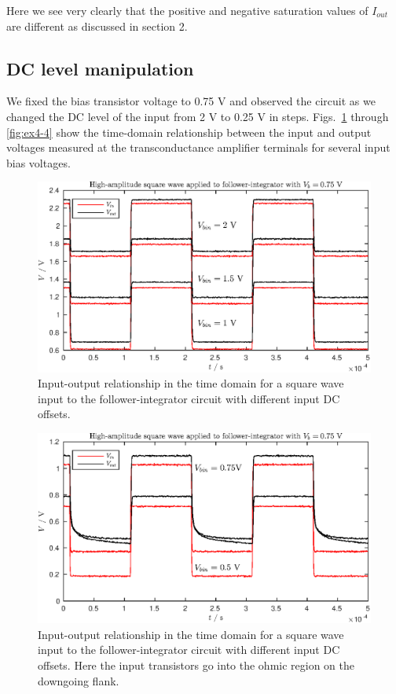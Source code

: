Here we see very clearly that the positive and negative saturation values of \(I_{out}\) are different as discussed in section 2. 

\subsection{DC level manipulation}
We fixed the bias transistor voltage to 0.75 V and observed the circuit as we changed the DC level of the input from 2 V to 0.25 V in steps. Figs.~\ref{fig:ex4-2} through
\ref{fig:ex4-4} show the time-domain relationship between the input and output voltages measured at the transconductance amplifier terminals for several input bias voltages.
\begin{figure}[!htb]
    \center
    \includegraphics{ex4-1.eps}
    \caption{Input-output relationship in the time domain for a square wave input to the follower-integrator circuit with different input DC offsets.}
    \label{fig:ex4-2}
\end{figure}
\begin{figure}[!htb]
    \center
    \includegraphics{ex4-2.eps}
    \caption{Input-output relationship in the time domain for a square wave input to the follower-integrator circuit with different input DC offsets. Here the
    input transistors go into the ohmic region on the downgoing flank.}
    \label{fig:ex4-3}
\end{figure}

